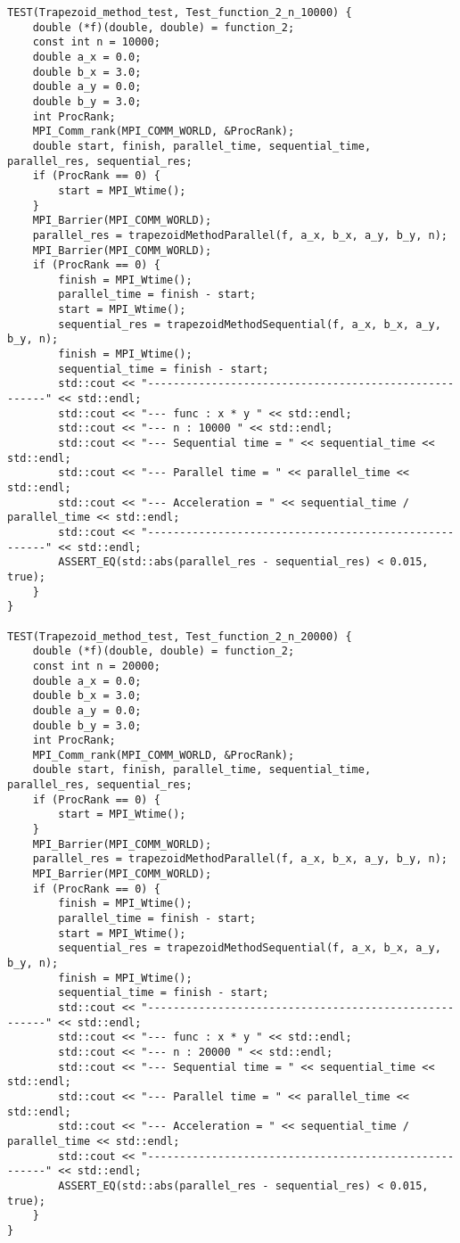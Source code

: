 \documentclass{report}
\begin{document}
\begin{lstlisting}
TEST(Trapezoid_method_test, Test_function_2_n_10000) {
    double (*f)(double, double) = function_2;
    const int n = 10000;
    double a_x = 0.0;
    double b_x = 3.0;
    double a_y = 0.0;
    double b_y = 3.0;
    int ProcRank;
    MPI_Comm_rank(MPI_COMM_WORLD, &ProcRank);
    double start, finish, parallel_time, sequential_time, parallel_res, sequential_res;
    if (ProcRank == 0) {
        start = MPI_Wtime();
    }
    MPI_Barrier(MPI_COMM_WORLD);
    parallel_res = trapezoidMethodParallel(f, a_x, b_x, a_y, b_y, n);
    MPI_Barrier(MPI_COMM_WORLD);
    if (ProcRank == 0) {
        finish = MPI_Wtime();
        parallel_time = finish - start;
        start = MPI_Wtime();
        sequential_res = trapezoidMethodSequential(f, a_x, b_x, a_y, b_y, n);
        finish = MPI_Wtime();
        sequential_time = finish - start;
        std::cout << "------------------------------------------------------" << std::endl;
        std::cout << "--- func : x * y " << std::endl;
        std::cout << "--- n : 10000 " << std::endl;
        std::cout << "--- Sequential time = " << sequential_time << std::endl;
        std::cout << "--- Parallel time = " << parallel_time << std::endl;
        std::cout << "--- Acceleration = " << sequential_time / parallel_time << std::endl;
        std::cout << "------------------------------------------------------" << std::endl;
        ASSERT_EQ(std::abs(parallel_res - sequential_res) < 0.015, true);
    }
}

TEST(Trapezoid_method_test, Test_function_2_n_20000) {
    double (*f)(double, double) = function_2;
    const int n = 20000;
    double a_x = 0.0;
    double b_x = 3.0;
    double a_y = 0.0;
    double b_y = 3.0;
    int ProcRank;
    MPI_Comm_rank(MPI_COMM_WORLD, &ProcRank);
    double start, finish, parallel_time, sequential_time, parallel_res, sequential_res;
    if (ProcRank == 0) {
        start = MPI_Wtime();
    }
    MPI_Barrier(MPI_COMM_WORLD);
    parallel_res = trapezoidMethodParallel(f, a_x, b_x, a_y, b_y, n);
    MPI_Barrier(MPI_COMM_WORLD);
    if (ProcRank == 0) {
        finish = MPI_Wtime();
        parallel_time = finish - start;
        start = MPI_Wtime();
        sequential_res = trapezoidMethodSequential(f, a_x, b_x, a_y, b_y, n);
        finish = MPI_Wtime();
        sequential_time = finish - start;
        std::cout << "------------------------------------------------------" << std::endl;
        std::cout << "--- func : x * y " << std::endl;
        std::cout << "--- n : 20000 " << std::endl;
        std::cout << "--- Sequential time = " << sequential_time << std::endl;
        std::cout << "--- Parallel time = " << parallel_time << std::endl;
        std::cout << "--- Acceleration = " << sequential_time / parallel_time << std::endl;
        std::cout << "------------------------------------------------------" << std::endl;
        ASSERT_EQ(std::abs(parallel_res - sequential_res) < 0.015, true);
    }
}


\end{lstlisting}
\end{document}

